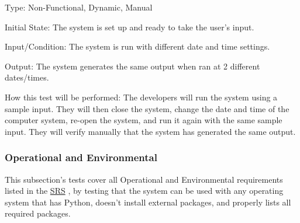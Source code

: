 \documentclass[12pt, titlepage]{article}
\begin{document}
\begin{enumerate}
Type: Non-Functional, Dynamic, Manual
					
Initial State: 
The system is set up and ready to take the user's input.

Input/Condition: 
The system is run with different date and time settings.

Output: 
The system generates the same output when ran at 2 different dates/times.

How this test will be performed: The developers will run the system using a sample input. They will then close the system, change the date and time of the computer system, re-open the system, and run it again with the same sample input. They will verify manually that the system has generated the same output.

\end{enumerate}

\subsubsection{Operational and Environmental}
This subsection's tests cover all Operational and Environmental requirements listed in the \href{https://github.com/paezha/PyERT-BLACK/blob/main/docs/SRS/SRS.pdf}{SRS} \citep{SRS}, by testing that the system can be used with any operating system that has Python, doesn't install external packages, and properly lists all required packages. 
\end{document}
